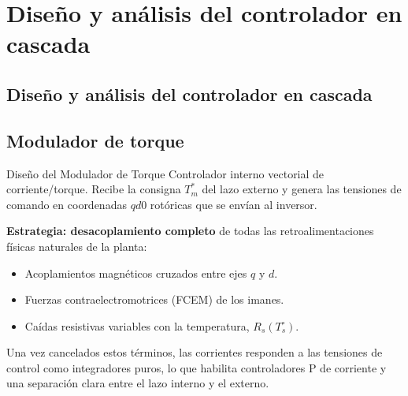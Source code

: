 \documentclass[aspectratio=169,t]{beamer}
\newcommand{\SecPresentacion}{Presentación del problema}
\newcommand{\SecMecanico}{Subsistema mecánico equivalente}
\newcommand{\SecElectromagnetico}{Subsistema electromagnético en coordenadas qd0}
\newcommand{\SecTermico}{Subsistema térmico}
\newcommand{\SecNLGlobal}{Sistema No Lineal Global}
\newcommand{\SecLPV}{Linealización Jacobiana (LPV)}
\newcommand{\SecLTI}{Obtención del modelo LTI equivalente}
\newcommand{\SecAnalisisLTI}{Análisis del modelo LTI aumentado}
\newcommand{\SecDinamica}{Respuesta dinámica en dominio del tiempo}
\newcommand{\SecControlador}{Diseño y análisis del controlador en cascada}
\newcommand{\SecVerifSpecs}{Verificación de desempeño: Especificaciones de operación}
\newcommand{\SecVerifOffset}{Verificación de desempeño: Offset de estado estacionario}
\newcommand{\SecVerifNoIdealidades}{Verificación de desempeño: No idealidades y comportamiento térmico}
\newcommand{\SecDiscretizacion}{Discretización del controlador}
\newcommand{\SecSoftware}{Codificación del software de control}
\newcommand{\AgendaItem}[3]{%
  \ifnum#1=#2
    {\scriptsize\bfseries\color{uncBlue}%
      \hyperlink{sec:#1}{\makebox[2.2em][r]{#1.}\hspace{0.7em}%
      \parbox[t]{0.86\textwidth}{#3}}\par}%
  \else
    {\scriptsize\color{black!26}%
      \hyperlink{sec:#1}{\makebox[2.2em][r]{#1.}\hspace{0.7em}%
      \parbox[t]{0.86\textwidth}{#3}}\par}%
  \fi
  \vspace{0.35mm}%
}
\newcommand{\AgendaBody}[1]{%
    \vspace{3mm}
    {\Large\bfseries\color{uncBlue}Tabla de contenidos\par}
    \vspace{2mm}
    \begin{minipage}{0.94\textwidth}
      \AgendaItem{1}{#1}{\SecPresentacion}
      \AgendaItem{2}{#1}{\SecMecanico}
      \AgendaItem{3}{#1}{\SecElectromagnetico}
      \AgendaItem{4}{#1}{\SecTermico}
      \AgendaItem{5}{#1}\SecNLGlobal
      \AgendaItem{6}{#1}{\SecLPV}
      \AgendaItem{7}{#1}{\SecLTI}
      \AgendaItem{8}{#1}{\SecAnalisisLTI}
      \AgendaItem{9}{#1}{\SecDinamica}
      \AgendaItem{10}{#1}{\SecControlador}
      \AgendaItem{11}{#1}{\SecVerifSpecs}
      \AgendaItem{12}{#1}{\SecVerifOffset}
      \AgendaItem{13}{#1}{\SecVerifNoIdealidades}
      \AgendaItem{14}{#1}{\SecDiscretizacion}
      \AgendaItem{15}{#1}{\SecSoftware}
    \end{minipage}
    \vfill
}
\newcommand{\AgendaSlideTarget}[2]{%
  \begin{frame}[plain]
    \hypertarget{#2}{}%
    \AgendaBody{#1}
  \end{frame}
}
\newcommand{\StartProjectSection}[2]{%
  \section{#2}%
  \subsection{#2}%
  \AgendaSlideTarget{#1}{sec:#1}%
}
\begin{document}
\StartProjectSection{10}{\SecControlador}
\subsection{Modulador de torque}

\begin{frame}{Diseño del Modulador de Torque}
{\small\color{uncGray}Controlador interno vectorial de corriente/torque. Recibe la consigna $T_m^{*}$ del lazo externo y genera las tensiones de comando en coordenadas $qd0$ rotóricas que se envían al inversor.}\par
\vspace{4mm}

\textbf{Estrategia: desacoplamiento completo} de todas las retroalimentaciones físicas naturales de la planta:
\begin{itemize}
\item Acoplamientos magnéticos cruzados entre ejes $q$ y $d$.
\item Fuerzas contraelectromotrices (FCEM) de los imanes.
\item Caídas resistivas variables con la temperatura, $R_s(T_s^\circ)$.
\end{itemize}

\vspace{2mm}
{\small Una vez cancelados estos términos, las corrientes responden a las tensiones de control como integradores puros, lo que habilita controladores P de corriente y una separación clara entre el lazo interno y el externo.}
\end{frame}
\end{document}
